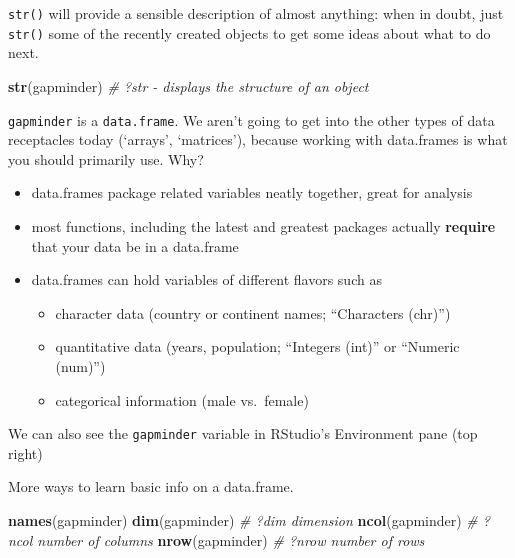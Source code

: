 \documentclass[]{book}
\newenvironment{Shaded}{\begin{snugshade}}{\end{snugshade}}
\newcommand{\KeywordTok}[1]{\textcolor[rgb]{0.13,0.29,0.53}{\textbf{#1}}}
\newcommand{\CommentTok}[1]{\textcolor[rgb]{0.56,0.35,0.01}{\textit{#1}}}
\newcommand{\NormalTok}[1]{#1}
\providecommand{\tightlist}{%
  \setlength{\itemsep}{0pt}\setlength{\parskip}{0pt}}
\theoremstyle{definition}
\theoremstyle{definition}
\theoremstyle{definition}
\theoremstyle{remark}
\begin{document}
\texttt{str()} will provide a sensible description of almost anything:
when in doubt, just \texttt{str()} some of the recently created objects
to get some ideas about what to do next.

\begin{Shaded}
\begin{Highlighting}[]
\KeywordTok{str}\NormalTok{(gapminder) }\CommentTok{# ?str - displays the structure of an object}
\end{Highlighting}
\end{Shaded}

\texttt{gapminder} is a \texttt{data.frame}. We aren't going to get into
the other types of data receptacles today (`arrays', `matrices'),
because working with data.frames is what you should primarily use. Why?

\begin{itemize}
\tightlist
\item
  data.frames package related variables neatly together, great for
  analysis
\item
  most functions, including the latest and greatest packages actually
  \textbf{require} that your data be in a data.frame
\item
  data.frames can hold variables of different flavors such as

  \begin{itemize}
  \tightlist
  \item
    character data (country or continent names; ``Characters (chr)'')
  \item
    quantitative data (years, population; ``Integers (int)'' or
    ``Numeric (num)'')
  \item
    categorical information (male vs.~female)
  \end{itemize}
\end{itemize}

We can also see the \texttt{gapminder} variable in RStudio's Environment
pane (top right)

More ways to learn basic info on a data.frame.

\begin{Shaded}
\begin{Highlighting}[]
\KeywordTok{names}\NormalTok{(gapminder)}
\KeywordTok{dim}\NormalTok{(gapminder)    }\CommentTok{# ?dim dimension}
\KeywordTok{ncol}\NormalTok{(gapminder)   }\CommentTok{# ?ncol number of columns}
\KeywordTok{nrow}\NormalTok{(gapminder)   }\CommentTok{# ?nrow number of rows}
\end{Highlighting}
\end{Shaded}
\end{document}
